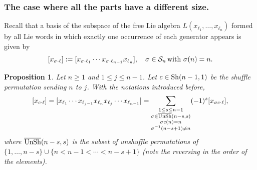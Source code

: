 \documentclass[12pt]{article}
\newtheorem{proposition}[theorem]{Proposition}
\begin{document}
\subsubsection{The case where all the parts have a different size.}
Recall that a basis of the subspace of the free Lie algebra $L(x_{\ell_1},\ldots,x_{\ell_n})$ formed by all Lie words in which exactly one occurrence of each generator appears is given by 
$$
[x_{\sigma\cdot \ell}]:=[x_{\sigma\cdot\ell_{1}} \cdots x_{\sigma \cdot \ell_{n-1}} x_{\ell_n}],\quad \sigma \in \mathcal{S}_{n}\,{\rm with}\,\, \sigma(n)=n.
$$
\begin{proposition}
\label{prop:trucnul}
Let $n\geq 1$ and $1\leq j\leq n-1$. Let $c\in {\rm Sh}(n-1,1)$ be the shuffle permutation sending $n$ to $j$. With the notations introduced before,
$$
[x_{c\cdot \ell}] = [x_{\ell_1}\cdots x_{\ell_{j-1}} x_{\ell_n} x_{\ell_j} \cdots x_{\ell_{n-1}}] = \sum_{\substack{1\leq s \leq n-1\\\sigma \in \overline{\rm UnSh}{(n-s,s)} \\ \sigma c(n)=n \\ \sigma^{-1}(n-s+1)\neq n}} (-1)^{s}[x_{\sigma c \cdot \ell}],
$$
where $\overline{\rm UnSh}{(n-s,s)}$ is the subset of unshuffle permutations of $\{1,\ldots,n-s\}\cup \{n < n-1 < \cdots < n-s+1\}$ (note the reversing in the order of the elements). 
\end{proposition}
\end{document}
